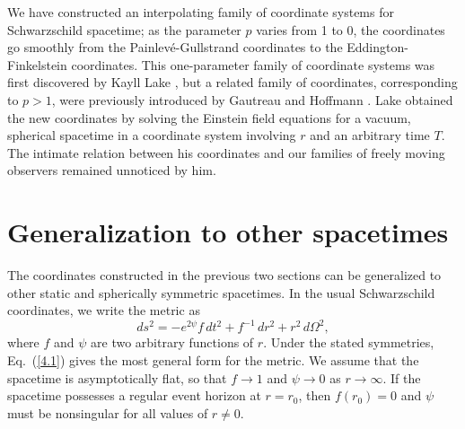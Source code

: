 We have constructed an interpolating family of coordinate systems for
Schwarzschild spacetime; as the parameter $p$ varies from 1 to 0, the
coordinates go smoothly from the Painlev\'e-Gullstrand coordinates to
the Eddington-Finkelstein coordinates. This one-parameter family of
coordinate systems was first discovered by Kayll Lake \cite{Lake}, but
a related family of coordinates, corresponding to $p > 1$, were
previously introduced by Gautreau and Hoffmann
\cite{GH,Gautreau,f0}. Lake obtained the new coordinates
by solving the Einstein field equations for a vacuum, spherical
spacetime in a coordinate system involving $r$ and an arbitrary time
$T$. The intimate relation between his coordinates and our families of
freely moving observers remained unnoticed by him. 

\section{Generalization to other spacetimes}

The coordinates constructed in the previous two sections can be
generalized to other static and spherically symmetric spacetimes. In 
the usual Schwarzschild coordinates, we write the metric as 
\begin{equation}
ds^2 = -e^{2\psi} f\, dt^2 + f^{-1}\, dr^2 + r^2\, d\Omega^2, 
\label{4.1}
\end{equation}
where $f$ and $\psi$ are two arbitrary functions of $r$. Under the
stated symmetries, Eq.~(\ref{4.1}) gives the most general form for the
metric. We assume that the spacetime is asymptotically flat, so that
$f \to 1$ and $\psi \to 0$ as $r \to \infty$. If the spacetime
possesses a regular event horizon at $r = r_0$, then $f(r_0) = 0$
and $\psi$ must be nonsingular for all values of $r \neq 0$.      

